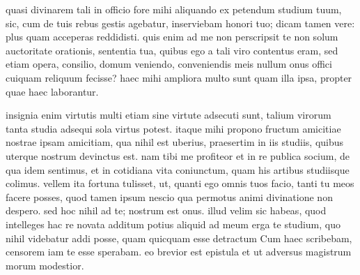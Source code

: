 


 quasi divinarem tali in officio fore mihi aliquando ex petendum studium tuum, sic, cum de tuis rebus gestis agebatur, inserviebam honori tuo; dicam tamen vere: plus quam acceperas reddidisti. quis enim ad me non perscripsit te non solum auctoritate orationis, sententia tua, quibus ego a tali viro contentus eram, sed etiam opera, consilio, domum veniendo, conveniendis meis nullum onus offici cuiquam reliquum fecisse? haec mihi ampliora multo sunt quam illa ipsa, propter quae haec laborantur.

 insignia enim virtutis multi etiam sine virtute adsecuti sunt, talium virorum tanta studia adsequi sola virtus potest. itaque mihi propono fructum amicitiae nostrae ipsam amicitiam, qua nihil est uberius, praesertim in iis studiis, quibus uterque nostrum devinctus est. nam tibi me profiteor et in re publica socium, de qua idem sentimus, et in cotidiana vita coniunctum, quam his artibus studiisque colimus. vellem ita fortuna tulisset, ut, quanti ego omnis tuos facio, tanti tu meos facere posses, quod tamen ipsum nescio qua permotus animi divinatione non despero. sed hoc nihil ad te; nostrum est onus. illud velim sic habeas, quod intelleges hac re novata additum potius aliquid ad meum erga te studium, quo nihil videbatur addi posse, quam quicquam esse detractum Cum haec scribebam, censorem iam te esse sperabam. eo brevior est epistula et ut adversus magistrum morum modestior.
